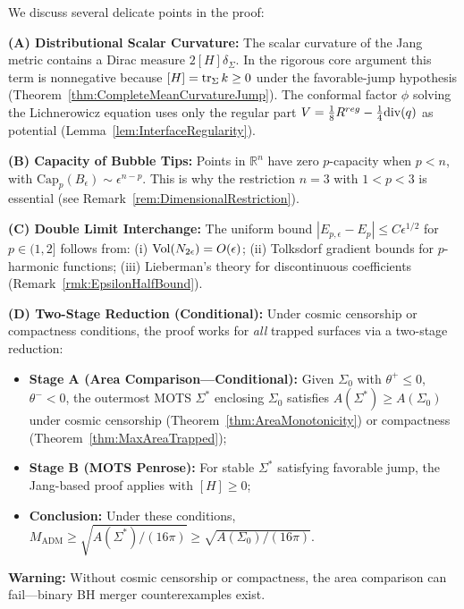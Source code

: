 \begin{remark}\label{rem:TechnicalDiscussion}
We discuss several delicate points in the proof:

\textbf{(A) Distributional Scalar Curvature:}
The scalar curvature of the Jang metric contains a Dirac measure $2[H]\delta_\Sigma$. In the rigorous core argument this term is nonnegative because $[H]=\operatorname{tr}_\Sigma k\ge 0$ under the favorable-jump hypothesis (Theorem~\ref{thm:CompleteMeanCurvatureJump}). The conformal factor $\phi$ solving the Lichnerowicz equation uses only the regular part $V = \frac{1}{8}R^{reg} - \frac{1}{4}\mathrm{div}(q)$ as potential (Lemma~\ref{lem:InterfaceRegularity}).

\textbf{(B) Capacity of Bubble Tips:}
Points in $\mathbb{R}^n$ have zero $p$-capacity when $p < n$, with $\mathrm{Cap}_p(B_\epsilon) \sim \epsilon^{n-p}$. This is why the restriction $n = 3$ with $1 < p < 3$ is essential (see Remark~\ref{rem:DimensionalRestriction}).

\textbf{(C) Double Limit Interchange:}
The uniform bound $|E_{p,\epsilon} - E_p| \le C\epsilon^{1/2}$ for $p \in (1, 2]$ follows from: (i) $\operatorname{Vol}(N_{2\epsilon}) = O(\epsilon)$; (ii) Tolksdorf gradient bounds for $p$-harmonic functions; (iii) Lieberman's theory for discontinuous coefficients (Remark~\ref{rmk:EpsilonHalfBound}).

\textbf{(D) Two-Stage Reduction (Conditional):}
Under cosmic censorship or compactness conditions, the proof works for \emph{all} trapped surfaces via a two-stage reduction:
\begin{itemize}
    \item \textbf{Stage A (Area Comparison---Conditional):} Given $\Sigma_0$ with $\theta^+ \le 0$, $\theta^- < 0$, the outermost MOTS $\Sigma^*$ enclosing $\Sigma_0$ satisfies $A(\Sigma^*) \ge A(\Sigma_0)$ under cosmic censorship (Theorem~\ref{thm:AreaMonotonicity}) or compactness (Theorem~\ref{thm:MaxAreaTrapped});
    \item \textbf{Stage B (MOTS Penrose):} For stable $\Sigma^*$ satisfying favorable jump, the Jang-based proof applies with $[H] \ge 0$;
    \item \textbf{Conclusion:} Under these conditions, $M_{\mathrm{ADM}} \ge \sqrt{A(\Sigma^*)/(16\pi)} \ge \sqrt{A(\Sigma_0)/(16\pi)}$.
\end{itemize}
\textbf{Warning:} Without cosmic censorship or compactness, the area comparison can fail---binary BH merger counterexamples exist.
\end{remark}

